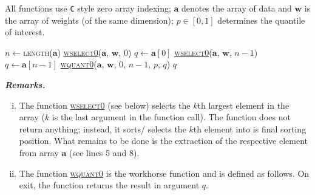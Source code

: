 \documentclass[a4paper,oneside,11pt,DIV=12]{scrartcl}
\newcommand{\code}[1]{{\texttt{#1}}}
\begin{document}
\noindent All functions use \code{C} style zero array indexing; $\bm a$ denotes the array of data and $\bm w$ is the array of weights (of the same dimension); $p \in [0,1]$ determines the quantile of interest.  

\begin{algorithmic}[1]
		\State $n \gets$\textsc{length}($\bm a$)
			\State \hyperlink{alg:wselect0}{\textsc{wselect0}}($\bm a$, $\bm w$, $0$)
			\State $q \gets \bm a[0]$
			\State \hyperlink{alg:wselect0}{\textsc{wselect0}}($\bm a$, $\bm w$, $n-1$)
			\State $q \gets \bm a[n-1]$
		\Else
			\State \hyperlink{alg:wquant0}{\textsc{wquant0}}($\bm a$, $\bm w$, $0$, $n-1$, $p$, $q$) 
		\EndIf
		\State \Return $q$
	\EndFunction
\end{algorithmic}

\vspace{1em}
\noindent\textbf{\sffamily \small \itshape Remarks.}
\vspace{-0.5em}
\begin{enumerate}[i)]
	\item The function \hyperlink{alg:wselect0}{\textsc{wselect0}} (see below) selects the $k$th largest element in the array ($k$ is the last argument in the function call). The function does not return anything; instead, it sorts/ selects the $k$th element into is final sorting position. What remains to be done is the extraction of the respective element from array $\bm a$ (see lines 5 and 8).  
	\item The function \hyperlink{alg:wquant0}{\textsc{wquant0}} is the workhorse function and is defined as follows. On exit, the function returns the result in argument $q$. 
\end{enumerate}

\vspace{1em}
\end{document}
